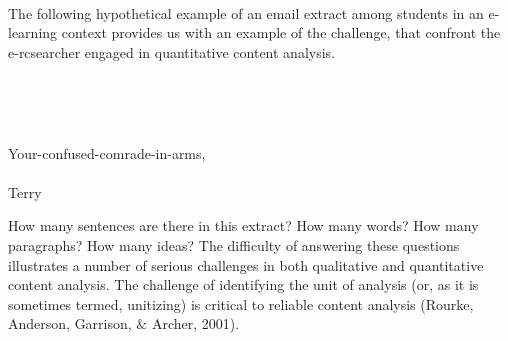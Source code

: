 \\

\noindent The following hypothetical example of an email extract among students in an e-learning context provides us with an example of the challenge, that confront the e-rcsearcher engaged in quantitative content analysis.\\
\begin{center}
\textbf {}\\
\end{center}
\begin{adjustwidth}{1cm}{}
\\
\end{adjustwidth}

\vspace{1cm}\noindent Your-confused-comrade-in-arms,\\
\\ Terry



\newpage
\begin{quote}
\footnotesize
\end{quote}
\noindent How many sentences are there in this extract? How many words? How many para­graphs? How many ideas? The difficulty of answering these questions illustrates a number of serious challenges in both qualitative and quantitative content analysis. The challenge of identifying the unit of analysis (or, as it is sometimes termed, unitizing) is critical to reliable content analysis (Rourke, Anderson, Garrison, $\&$ Archer, 2001).\\

\\

